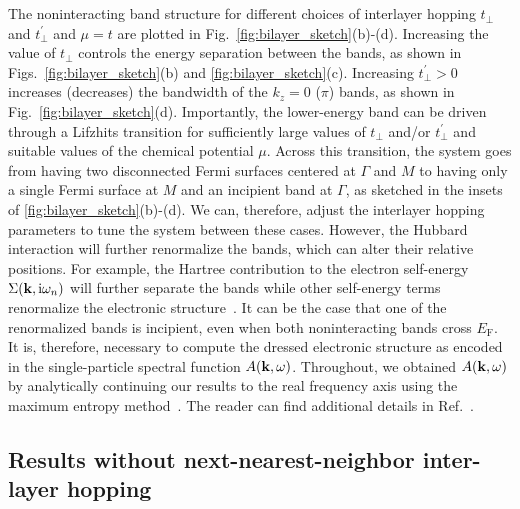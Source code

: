 \documentclass[prb,twocolumn,amsmath,amssymb,superscriptaddress,floatfix,nofootinbib]{revtex4-2}
\begin{document}
The noninteracting band structure for different choices of interlayer hopping $t^{\phantom\prime}_\perp$ and $t_\perp^\prime$ and $\mu = t$ are plotted in Fig.~\ref{fig:bilayer_sketch}(b)-(d). Increasing the value of $t_\perp$ controls the energy separation between the bands, as shown in Figs.~\ref{fig:bilayer_sketch}(b) and \ref{fig:bilayer_sketch}(c). Increasing $t_\perp^\prime > 0$ increases (decreases) the bandwidth of the $k_z = 0$ ($\pi$) bands, as shown in Fig.~\ref{fig:bilayer_sketch}(d). Importantly, the lower-energy band can be driven through a Lifzhits transition for sufficiently large values of $t^{\phantom\prime}_\perp$ and/or $t_\perp^\prime$ and suitable values of the chemical potential $\mu$. Across this transition, the system goes from having two disconnected Fermi surfaces centered at $\Gamma$ and $M$ to having only a single Fermi surface at $M$ and an incipient band at $\Gamma$, as sketched in the insets of \ref{fig:bilayer_sketch}(b)-(d). 
We can, therefore, adjust the interlayer hopping parameters to tune the system between these cases. 
However, the Hubbard interaction will further renormalize the bands, which can alter their relative positions. For example, the Hartree contribution to the electron self-energy $\Sigma({\bf k},\mathrm{i}\omega_n)$ will further separate the bands \cite{KurokiFlex2020, RademakerEnhanced2021} while other self-energy terms renormalize the electronic structure~\cite{KurokiFlex2020, RademakerEnhanced2021, Maier2019, PelliciariRIXS2020}. It can be the case that one of the renormalized bands is incipient, even when both noninteracting bands cross $E_\mathrm{F}$. It is, therefore, necessary to compute the dressed electronic structure as encoded in the single-particle spectral function $A({\bf k},\omega)$. Throughout, we obtained  $A({\bf k},\omega)$ by analytically continuing our results to the real frequency axis using the maximum entropy method~\cite{Gubernatis1991}. The reader can find additional details in Ref.~. 

\subsection{Results without next-nearest-neighbor inter-layer hopping}
\end{document}
